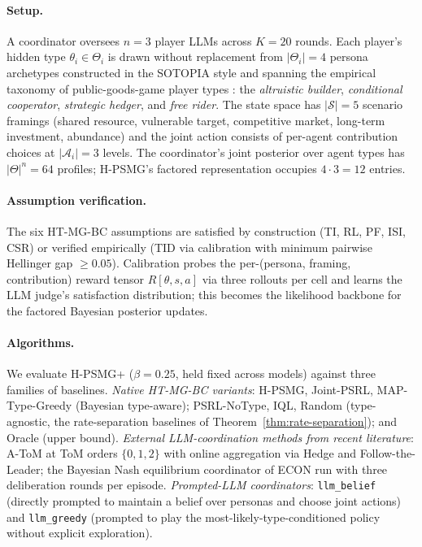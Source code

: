 \documentclass{article}
\def\textsuperscript#1{#1}%
\begin{document}
\paragraph{Setup.} A coordinator oversees $n = 3$ player LLMs across
$K = 20$ rounds. Each player's hidden type
$\theta_i \in \Theta_i$ is drawn without replacement from $|\Theta_i| = 4$
persona archetypes constructed in the SOTOPIA style \citep{zhou2024sotopia} and
spanning the empirical taxonomy of public-goods-game player types
\citep{fischbacher2001people}: the \emph{altruistic builder},
\emph{conditional cooperator}, \emph{strategic hedger}, and \emph{free rider}.
The state space has $|\mathcal{S}| = 5$ scenario framings (shared resource,
vulnerable target, competitive market, long-term investment, abundance) and the
joint action consists of per-agent contribution choices at $|\mathcal{A}_i| = 3$
levels. The coordinator's joint posterior over agent types has $|\Theta|^n = 64$
profiles; H-PSMG's factored representation occupies $4 \cdot 3 = 12$ entries.

\paragraph{Assumption verification.} The six HT-MG-BC assumptions are
satisfied by construction (TI, RL, PF, ISI, CSR) or verified empirically (TID
via calibration with minimum pairwise Hellinger gap $\geq 0.05$). Calibration
probes the per-(persona, framing, contribution) reward tensor
$R[\theta, s, a]$ via three rollouts per cell and learns the LLM judge's
satisfaction distribution; this becomes the likelihood backbone for the
factored Bayesian posterior updates.

\paragraph{Algorithms.} We evaluate H-PSMG\textsuperscript{+} ($\beta = 0.25$,
held fixed across models) against three families of baselines. \emph{Native
HT-MG-BC variants}: H-PSMG, Joint-PSRL, MAP-Type-Greedy (Bayesian type-aware);
PSRL-NoType, IQL, Random (type-agnostic, the rate-separation baselines of
Theorem~\ref{thm:rate-separation}); and Oracle (upper bound). \emph{External
LLM-coordination methods from recent literature}: A-ToM \citep{xu2026atom} at
ToM orders $\{0, 1, 2\}$ with online aggregation via Hedge \citep{cesa1997use}
and Follow-the-Leader; the Bayesian Nash equilibrium coordinator of
ECON \citep{yang2025econ} run with three deliberation rounds per episode.
\emph{Prompted-LLM coordinators}: \texttt{llm\_belief} (directly prompted to
maintain a belief over personas and choose joint actions) and \texttt{llm\_greedy}
(prompted to play the most-likely-type-conditioned policy without explicit
exploration).
\end{document}
